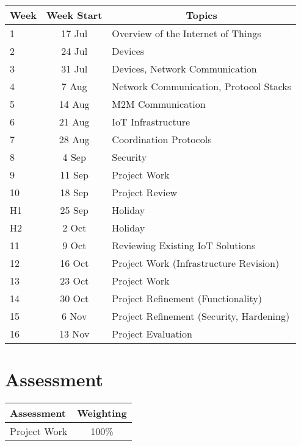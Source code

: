 \documentclass{article}
\begin{document}
\renewcommand{\arraystretch}{1.5}
\begin{tabular}{|l|c|l|}
\hline
 Week & Week Start & \multicolumn{1}{c|}{Topics}             \\ \hline
 1    & 17 Jul     & Overview of the Internet of Things      \\ \hline
 2    & 24 Jul     & Devices                                 \\ \hline
 3    &  31 Jul     & Devices, Network Communication          \\ \hline
 4    & 7 Aug     & Network Communication, Protocol Stacks  \\ \hline
 5    & 14 Aug     & M2M Communication                       \\ \hline
 6    & 21 Aug     & IoT Infrastructure                      \\ \hline
 7    & 28 Aug     & Coordination Protocols                  \\ \hline
 8    &  4 Sep     & Security                                \\ \hline
 9    & 11 Sep     & Project Work                            \\ \hline
 10   & 18 Sep     & Project Review                          \\ \hline
 H1   & 25 Sep     & Holiday                                 \\ \hline
 H2   &  2 Oct     & Holiday                                 \\ \hline
 11   & 9 Oct     & Reviewing Existing IoT Solutions        \\ \hline
 12   & 16 Oct     & Project Work (Infrastructure Revision)  \\ \hline
 13   & 23 Oct     & Project Work                            \\ \hline
 14   &  30 Oct     & Project Refinement (Functionality)      \\ \hline
 15   &  6 Nov     & Project Refinement (Security, Hardening)\\ \hline
 16   & 13 Nov     & Project Evaluation                      \\ \hline
\end{tabular}

\section*{Assessment}

\begin{tabular}{|l|c|}
\hline
Assessment                  &  Weighting \\ \hline
Project Work                &  100\% \\ \hline
\end{tabular}
\end{document}
